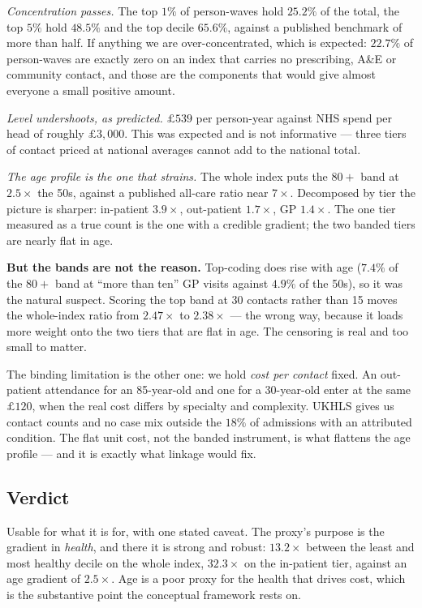 \documentclass[11pt]{article}
\begin{document}
\emph{Concentration passes.} The top $1\%$ of person-waves hold $25.2\%$ of
the total, the top $5\%$ hold $48.5\%$ and the top decile $65.6\%$, against a
published benchmark of more than half. If anything we are over-concentrated,
which is expected: $22.7\%$ of person-waves are exactly zero on an index that
carries no prescribing, A\&E or community contact, and those are the
components that would give almost everyone a small positive amount.

\emph{Level undershoots, as predicted.} $\pounds539$ per person-year against
NHS spend per head of roughly $\pounds3{,}000$. This was expected and is not
informative --- three tiers of contact priced at national averages cannot add
to the national total.

\emph{The age profile is the one that strains.} The whole index puts the
$80+$ band at $2.5\times$ the 50s, against a published all-care ratio near
$7\times$. Decomposed by tier the picture is sharper: in-patient $3.9\times$,
out-patient $1.7\times$, GP $1.4\times$. The one tier measured as a true
count is the one with a credible gradient; the two banded tiers are nearly
flat in age.

\textbf{But the bands are not the reason.} Top-coding does rise with age
($7.4\%$ of the $80+$ band at ``more than ten'' GP visits against $4.9\%$ of
the 50s), so it was the natural suspect. Scoring the top band at 30 contacts
rather than 15 moves the whole-index ratio from $2.47\times$ to
$2.38\times$ --- the wrong way, because it loads more weight onto the two
tiers that are flat in age. The censoring is real and too small to matter.

The binding limitation is the other one: we hold \emph{cost per contact}
fixed. An out-patient attendance for an 85-year-old and one for a
30-year-old enter at the same $\pounds120$, when the real cost differs by
specialty and complexity. UKHLS gives us contact counts and no case mix
outside the $18\%$ of admissions with an attributed condition. The flat unit
cost, not the banded instrument, is what flattens the age profile --- and it
is exactly what linkage would fix.

\subsection*{Verdict}

Usable for what it is for, with one stated caveat. The proxy's purpose is the
gradient in \emph{health}, and there it is strong and robust: $13.2\times$
between the least and most healthy decile on the whole index, $32.3\times$ on
the in-patient tier, against an age gradient of $2.5\times$. Age is a poor
proxy for the health that drives cost, which is the substantive point the
conceptual framework rests on.
\end{document}
